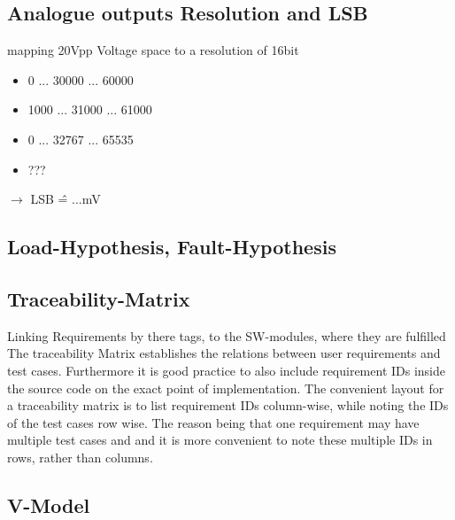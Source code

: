 \documentclass[master,english,smartquotes,apa]{hgbthesis}
\begin{document}
	\subsection{Analogue outputs Resolution and LSB}
	mapping 20Vpp Voltage space to a resolution of 16bit
	\begin{itemize}
		\item 0 ... 30000 ... 60000
		\item 1000 ... 31000 ... 61000
		\item 0 ... 32767 ... 65535
		\item ???
	\end{itemize}
	$\rightarrow$ LSB \^{=} ...mV

			\subsection{Load-Hypothesis, Fault-Hypothesis}
			\subsection{Traceability-Matrix}
			Linking Requirements by there tags, to the SW-modules, where they are fulfilled
			The traceability Matrix establishes the relations between user requirements and test cases. Furthermore it is good practice to also include requirement IDs inside the source code on the exact point of implementation. The convenient layout for a traceability matrix is to list requirement IDs column-wise, while noting the IDs of the test cases row wise. The reason being that one requirement may have multiple test cases and and it is more convenient to note these multiple IDs in rows, rather than columns.
			\subsection{V-Model}
\end{document}
